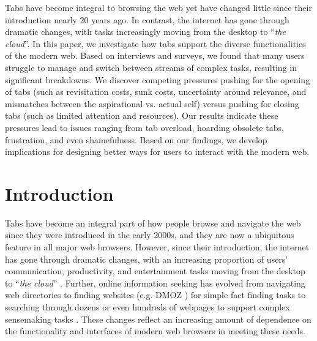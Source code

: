 
Tabs have become integral to browsing the web yet have changed little since their introduction nearly 20 years ago. In contrast, the internet has gone through dramatic changes, with tasks increasingly moving from the desktop to ``\emph{the cloud}''. In this paper, we investigate how tabs support the diverse functionalities of the modern web. Based on interviews and surveys, we found that many users struggle to manage and switch between streams of complex tasks, resulting in significant breakdowns. We discover competing pressures pushing for the opening of tabs (such as revisitation costs, sunk costs, uncertainty around relevance, and mismatches between the aspirational vs. actual self) versus pushing for closing tabs (such as limited attention and resources). Our results indicate these pressures lead to issues ranging from tab overload, hoarding obsolete tabs, frustration, and even shamefulness. Based on our findings, we develop implications for designing better ways for users to interact with the modern web.


\section{Introduction}
Tabs have become an integral part of how people browse and navigate the web since they were introduced in the early 2000s, and they are now a ubiquitous feature in all major web browsers. However, since their introduction, the internet has gone through dramatic changes, with an increasing proportion of users' communication, productivity, and entertainment tasks moving from the desktop to ``\emph{the cloud}'' \cite{Dubroy:2010:STB:1753326.1753426}. Further, online information seeking has evolved from navigating web directories to finding websites (e.g. DMOZ \cite{dmoz}) for simple fact finding tasks to searching through dozens or even hundreds of webpages to support complex sensemaking tasks \cite{pirolli1999information,marchionini2006exploratory}. These changes reflect an increasing amount of dependence on the functionality and interfaces of modern web browsers in meeting these needs.

